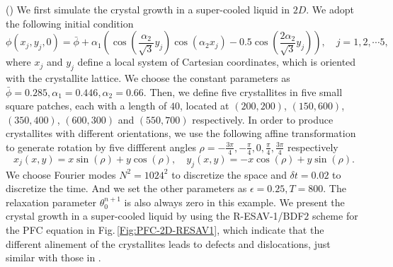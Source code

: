 \documentclass[final,review,onefignum,onetabnum]{siamart190516}
\theoremstyle{plain}
\begin{document}
()  We first simulate the crystal growth in a super-cooled liquid in $2D$. 
We adopt the following initial condition
\begin{equation}
\phi\left(x_{j}, y_{j}, 0\right)=\bar{\phi}+\alpha_{1}\left(\cos \left(\frac{\alpha_{2}}{\sqrt{3}} y_{j}\right) \cos \left(\alpha_{2} x_{j}\right)-0.5 \cos \left(\frac{2 \alpha_{2}}{\sqrt{3}} y_{j}\right)\right), \quad j=1,2, \cdots 5,
\end{equation}
where $x_j$ and $y_j$ define a local system of Cartesian coordinates, which is oriented with the crystallite lattice. 
We choose the constant parameters as $\bar{\phi} = 0.285, \alpha_{1} = 0.446, \alpha_{2} = 0.66$. 
Then, we define five crystallites in five small square patches, each  with a length of $40$, located at $(200, 200)$, $(150, 600)$, $(350, 400)$, $(600, 300)$ and $(550, 700)$ respectively. 
In order to produce crystallites with different orientations, we use the following affine transformation to generate rotation by five diffferent angles $\rho=-\frac{3 \pi}{4}, -\frac{\pi}{4}, 0, \frac{\pi}{4}, \frac{3 \pi}{4}$ respectively 
\begin{equation}
x_{j}(x, y)=x \sin (\rho)+y \cos (\rho), \quad y_{j}(x, y)=-x \cos (\rho)+y \sin (\rho).
\end{equation}
We choose Fourier modes $N^2=1024^2$ to discretize the space and $\delta t =0.02$ to discretize the time. 
And we set the other parameters as $\epsilon=0.25, T=800$. 
The relaxation parameter $\theta_0^{n+1}$ is also always zero in this example. 
We present the crystal growth in a super-cooled liquid by using the R-ESAV-1/BDF$2$ scheme for the PFC equation in Fig.\,\ref{Fig:PFC-2D-RESAV1}, which indicate that the different alinement of the crystallites leads to defects and dislocations, just similar with those in \cite{yang2017linearly, li2020stability}.
\end{document}
